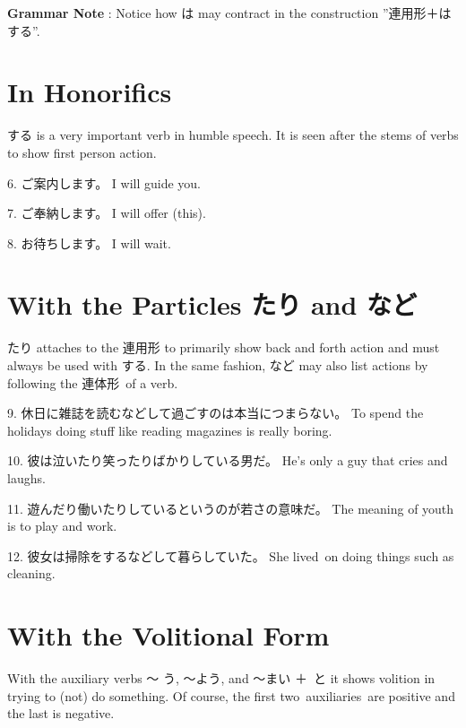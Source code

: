 \par{\textbf{Grammar Note }: Notice how は may contract in the construction ”連用形＋はする”. }
      
\section{In Honorifics}
 
\par{ する is a very important verb in humble speech. It is seen after the stems of verbs to show first person action. }

\par{6. ご案内します。 \hfill\break
I will guide you. }

\par{7. ご奉納します。 \hfill\break
I will offer (this). }

\par{8. お待ちします。 \hfill\break
I will wait. }
      
\section{With the Particles たり and など}
 
\par{ たり attaches to the 連用形 to primarily show back and forth action and must always be used with する. In the same fashion, など may also list actions by following the 連体形 of a verb. }

\par{9. 休日に雑誌を読むなどして過ごすのは本当につまらない。 \hfill\break
To spend the holidays doing stuff like reading magazines is really boring. }

\par{10. 彼は泣いたり笑ったりばかりしている男だ。 \hfill\break
He's only a guy that cries and laughs. }

\par{11. 遊んだり働いたりしているというのが若さの意味だ。 \hfill\break
The meaning of youth is to play and work. }

\par{12. 彼女は掃除をするなどして暮らしていた。 \hfill\break
She lived on doing things such as cleaning. }
      
\section{With the Volitional Form}
 
\par{ With the auxiliary verbs ～ う, ～よう, and ～まい ＋ と it shows volition in trying to (not) do something. Of course, the first two auxiliaries are positive and the last is negative. }

